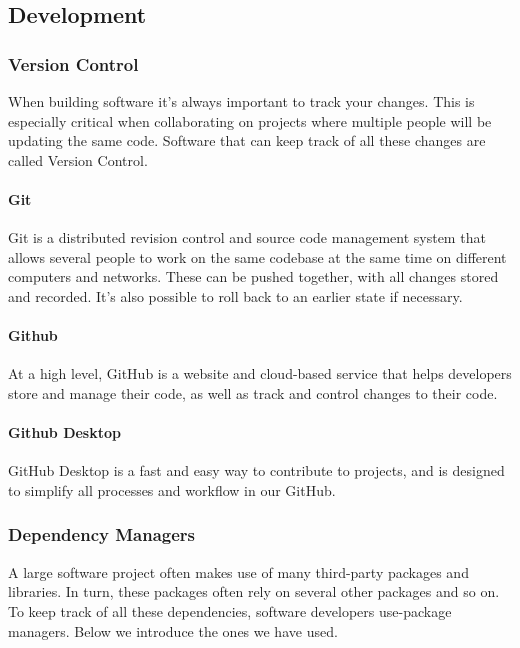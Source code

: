 \subsection{Development}
\subsubsection{Version Control}
When building software it’s always important to track your changes. This is especially critical when collaborating on projects where multiple people will be updating the same code. Software that can keep track of all
these changes are called Version Control.

\paragraph*{Git}
Git is a distributed revision control and source code management system that
allows several people to work on the same codebase at the same time on different
computers and networks. These can be pushed together, with all changes stored and
recorded. It’s also possible to roll back to an earlier state if necessary.
\paragraph*{Github}
At a high level, GitHub is a website and cloud-based service that helps developers store and manage their code, as well as track and control changes to their code.

\paragraph*{Github Desktop}
GitHub Desktop is a fast and easy way to contribute to projects, and is designed to simplify all processes and workflow in our GitHub.

\subsubsection{Dependency Managers}
A large software project often makes use of many third-party packages and libraries. In turn, these packages
often rely on several other packages and so on. To keep track of all these dependencies, software developers
use-package managers. Below we introduce the ones we have used.
